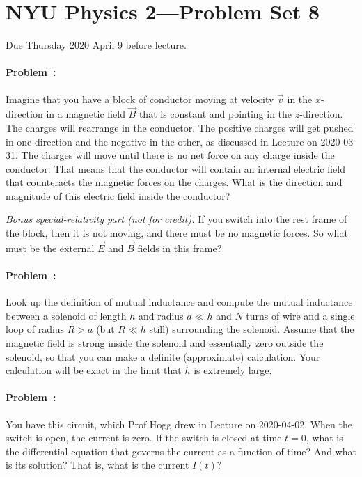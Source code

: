 \documentclass[12pt]{article}
\begin{document}
\section*{NYU Physics 2---Problem Set 8}

Due Thursday 2020 April 9 before lecture.

\paragraph{Problem~\theproblem:}%
Imagine that you have a block of conductor moving at velocity
$\vec{v}$ in the $x$-direction in a magnetic field $\vec{B}$ that is
constant and pointing in the $z$-direction. The charges will rearrange
in the conductor. The positive charges will get pushed in one
direction and the negative in the other, as discussed in Lecture on
2020-03-31. The charges will move until there is no net force on any
charge inside the conductor. That means that the conductor will
contain an internal electric field that counteracts the magnetic
forces on the charges. What is the direction and magnitude of this
electric field inside the conductor?

\textsl{Bonus special-relativity part (not for credit):} If you switch
into the rest frame of the block, then it is not moving, and there
must be no magnetic forces. So what must be the external $\vec{E}$ and
$\vec{B}$ fields in this frame?

\paragraph{Problem~\theproblem:}%
Look up the definition of mutual inductance and compute the mutual
inductance between a solenoid of length $h$ and radius $a\ll h$ and
$N$ turns of wire and a single loop of radius $R>a$ (but $R\ll h$
still) surrounding the solenoid. Assume that the magnetic field is
strong inside the solenoid and essentially zero outside the solenoid,
so that you can make a definite (approximate) calculation. Your
calculation will be exact in the limit that $h$ is extremely large.

\paragraph{Problem~\theproblem:}%
You have this circuit, which Prof Hogg drew in Lecture on 2020-04-02.
When the switch is open, the current is zero. If the switch is closed
at time $t=0$, what is the differential equation that governs the
current as a function of time? And what is its solution? That is,
what is the current $I(t)$?
\end{document}
